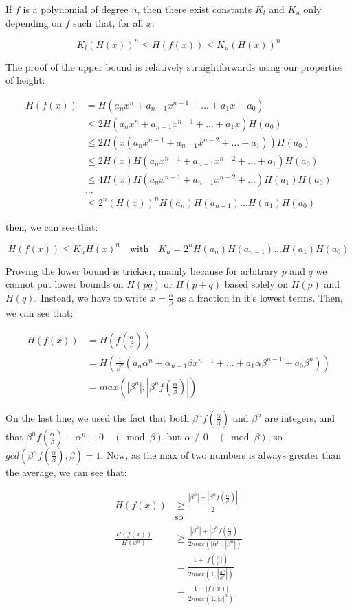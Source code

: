 \documentclass{article}
\begin{document}
If $f$ is a polynomial of degree $n$, then there exist constants $K_l$ and $K_u$ only depending on $f$ such that, for all $x$:

\[ K_l (H(x))^n \leq H(f(x)) \leq K_u (H(x))^n \]

The proof of the upper bound is relatively straightforwards using our properties of height:

\begin{align*} 
H(f(x)) &= H(a_n x^n + a_{n-1}x^{n-1} + \dots + a_1 x + a_0)\\
&\leq 2H(a_n x^n + a_{n-1}x^{n-1} + \dots + a_1 x)H(a_0)\\
&\leq 2H(x(a_n x^{n-1} + a_{n-1}x^{n-2} + \dots + a_1))H(a_0)\\
&\leq 2H(x)H(a_n x^{n-1} + a_{n-1}x^{n-2} + \dots + a_1)H(a_0)\\
&\leq 4H(x)H(a_n x^{n-1} + a_{n-1}x^{n-2} + \dots)H(a_1)H(a_0)\\
&\dots\\
&\leq 2^n (H(x))^n H(a_n)H(a_{n-1})\dots H(a_1)H(a_0)
\end{align*} 

then, we can see that:

\[ H(f(x)) \leq K_u H(x)^n \quad \text{with} \quad K_u = 2^n H(a_n)H(a_{n-1})\dots H(a_1)H(a_0) \]

Proving the lower bound is trickier, mainly because for arbitrary $p$ and $q$ we cannot put lower bounds on $H(pq)$ or $H(p + q)$ based solely on $H(p)$ and $H(q)$. Instead, we have to write $x = \frac{\alpha}{\beta}$ as a fraction in it's lowest terms. Then, we can see that:

\begin{align*}
    H(f(x)) &= H(f(\frac{\alpha}{\beta}))\\
            &= H(\frac{1}{\beta^n}(a_n \alpha^n + \alpha_{n-1} \beta x^{n-1} + \dots + a_1 \alpha \beta^{n-1} + a_0 \beta^n))\\
            &= max(|\beta^n|, |\beta^n f(\frac{\alpha}{\beta})|)\
\end{align*}

On the last line, we used the fact that both $\beta^n f(\frac{\alpha}{\beta})$ and $\beta^n$ are integers, and that $\beta^n f(\frac{\alpha}{\beta}) - \alpha^n \equiv 0 \quad (\bmod{\beta})$ but $\alpha \not\equiv 0 \quad (\bmod{\beta})$, so $gcd(\beta^n f(\frac{\alpha}{\beta}), \beta) = 1$. Now, as the max of two numbers is always greater than the average, we can see that:

\begin{align*}
    H(f(x)) & \geq \frac{|\beta^n| + |\beta^n f(\frac{\alpha}{\beta})|}{2}\\
    &\text{so}\\
    \frac{H(f(x))}{H(x^n)} &\geq \frac{|\beta^n| + |\beta^n f(\frac{\alpha}{\beta})|}{2 max(|\alpha^n|,|\beta^n|)}\\
                        &= \frac{1 + |f(\frac{\alpha}{\beta}|)}{2 max(1, |\frac{\alpha^n}{\beta^n}|)}\\
                        &= \frac{1 + |f(x)|}{2 max(1, |x|^n)}
\end{align*}
\end{document}
